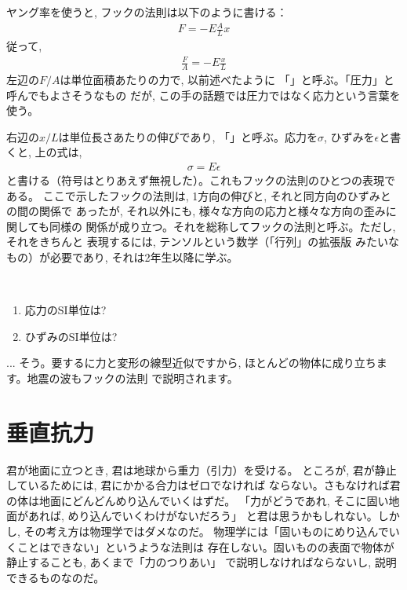 ヤング率を使うと, フックの法則は以下のように書ける：
\begin{eqnarray}
F=-E\frac{A}{L}x
\end{eqnarray}
従って, 
\begin{eqnarray}
\frac{F}{A}=-E\frac{x}{L}
\end{eqnarray}
左辺の$F/A$は単位面積あたりの力で, 以前述べたように
「」と呼ぶ。「圧力」と呼んでもよさそうなもの
だが, この手の話題では圧力ではなく応力という言葉を使う。

右辺の$x/L$は単位長さあたりの伸びであり, 
「」と呼ぶ。応力を$\sigma$, 
ひずみを$\epsilon$と書くと, 上の式は, 
\begin{eqnarray}
\sigma=E\epsilon
\end{eqnarray}
と書ける（符号はとりあえず無視した）。これもフックの法則のひとつの表現である。
ここで示したフックの法則は, 1方向の伸びと, それと同方向のひずみとの間の関係で
あったが, それ以外にも, 様々な方向の応力と様々な方向の歪みに関しても同様の
関係が成り立つ。それを総称してフックの法則と呼ぶ。ただし, それをきちんと
表現するには, テンソルという数学（「行列」の拡張版
みたいなもの）が必要であり, それは2年生以降に学ぶ。\mv

\begin{q}\label{q:stress_strain}　
\begin{enumerate}
\item 応力のSI単位は?
\item ひずみのSI単位は?
\end{enumerate}
\end{q}\mv


\begin{faq}{\small{}
... そう。要するに力と変形の線型近似ですから, 
ほとんどの物体に成り立ちます。地震の波もフックの法則
で説明されます。}\end{faq}
\hv



\section{垂直抗力}
君が地面に立つとき, 君は地球から重力（引力）を受ける。
ところが, 君が静止しているためには, 君にかかる合力はゼロでなければ
ならない。さもなければ君の体は地面にどんどんめり込んでいくはずだ。
「力がどうであれ, そこに固い地面があれば, めり込んでいくわけがないだろう」
と君は思うかもしれない。しかし, その考え方は物理学ではダメなのだ。
物理学には「固いものにめり込んでいくことはできない」というような法則は
存在しない。固いものの表面で物体が静止することも, あくまで「力のつりあい」
で説明しなければならないし, 説明できるものなのだ。

